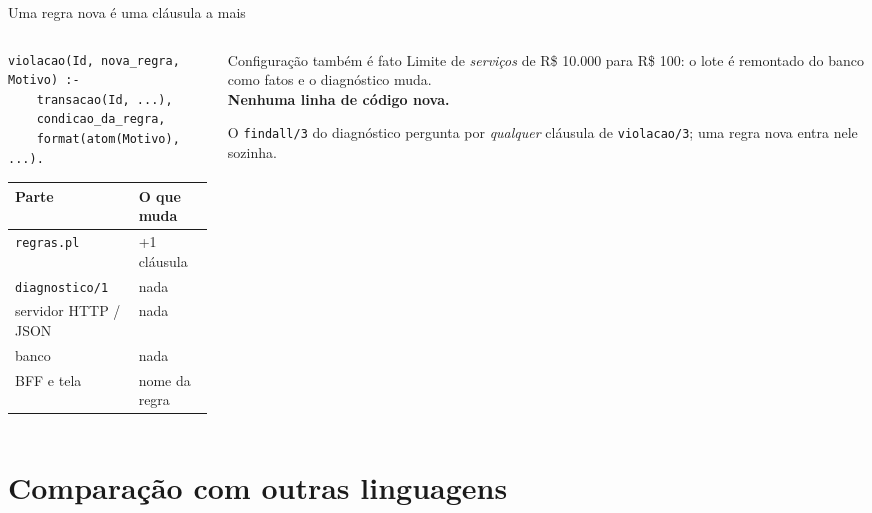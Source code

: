 \documentclass[aspectratio=169,11pt,xcolor=table]{beamer}
\begin{document}
\begin{frame}[fragile]{Uma regra nova é uma cláusula a mais}
  \begin{columns}[T]
    \begin{column}{0.50\textwidth}
\begin{lstlisting}[style=pl]
violacao(Id, nova_regra, Motivo) :-
    transacao(Id, ...),
    condicao_da_regra,
    format(atom(Motivo), ...).
\end{lstlisting}
      \vspace{6pt}
      \small
      \begin{tabular}{@{}l l@{}}
        \toprule
        \textbf{Parte} & \textbf{O que muda} \\
        \midrule
        \texttt{regras.pl} & +1 cláusula \\
        \texttt{diagnostico/1} & nada \\
        servidor HTTP / JSON & nada \\
        banco & nada \\
        BFF e tela & nome da regra \\
        \bottomrule
      \end{tabular}
    \end{column}
    \begin{column}{0.45\textwidth}
      \begin{block}{Configuração também é fato}
        \small
        Limite de \emph{serviços} de R\$ 10.000 para R\$ 100: o lote é remontado
        do banco como fatos e o diagnóstico muda.\\[4pt]
        \textbf{Nenhuma linha de código nova.}
      \end{block}
      \vspace{6pt}
      {\small O \texttt{findall/3} do diagnóstico pergunta por \emph{qualquer}
      cláusula de \texttt{violacao/3}; uma regra nova entra nele sozinha.}
    \end{column}
  \end{columns}
\end{frame}

\section{Comparação com outras linguagens}
\end{document}
